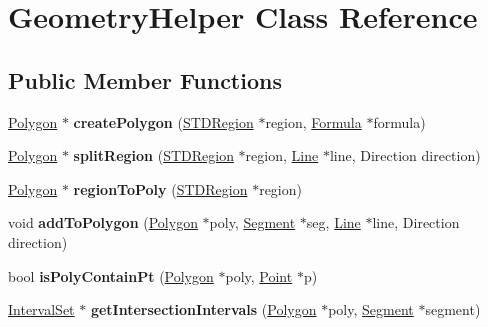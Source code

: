 \hypertarget{classGeometryHelper}{\section{Geometry\-Helper Class Reference}
\label{classGeometryHelper}
}
\subsection*{Public Member Functions}
\begin{DoxyCompactItemize}
\item 
\hypertarget{classGeometryHelper_a23b405d720cf3806b073a406d9ae105f}{\hyperlink{classPolygon}{Polygon} $\ast$ {\bfseries create\-Polygon} (\hyperlink{classSTDRegion}{S\-T\-D\-Region} $\ast$region, \hyperlink{classFormula}{Formula} $\ast$formula)}\label{classGeometryHelper_a23b405d720cf3806b073a406d9ae105f}

\item 
\hypertarget{classGeometryHelper_a916aee5efb1bead5b9b31ae96113a740}{\hyperlink{classPolygon}{Polygon} $\ast$ {\bfseries split\-Region} (\hyperlink{classSTDRegion}{S\-T\-D\-Region} $\ast$region, \hyperlink{classLine}{Line} $\ast$line, Direction direction)}\label{classGeometryHelper_a916aee5efb1bead5b9b31ae96113a740}

\item 
\hypertarget{classGeometryHelper_aa838f64e3e5ba0bd51e974f504b46ee2}{\hyperlink{classPolygon}{Polygon} $\ast$ {\bfseries region\-To\-Poly} (\hyperlink{classSTDRegion}{S\-T\-D\-Region} $\ast$region)}\label{classGeometryHelper_aa838f64e3e5ba0bd51e974f504b46ee2}

\item 
\hypertarget{classGeometryHelper_a0c3abc152f2440a387def0530ca08b5e}{void {\bfseries add\-To\-Polygon} (\hyperlink{classPolygon}{Polygon} $\ast$poly, \hyperlink{classSegment}{Segment} $\ast$seg, \hyperlink{classLine}{Line} $\ast$line, Direction direction)}\label{classGeometryHelper_a0c3abc152f2440a387def0530ca08b5e}

\item 
\hypertarget{classGeometryHelper_ac1d7fd8e11f5613246c997efe4ad8b58}{bool {\bfseries is\-Poly\-Contain\-Pt} (\hyperlink{classPolygon}{Polygon} $\ast$poly, \hyperlink{structPoint}{Point} $\ast$p)}\label{classGeometryHelper_ac1d7fd8e11f5613246c997efe4ad8b58}

\item 
\hypertarget{classGeometryHelper_af6c198ccd6296b4f1a6bb8a019999eaf}{\hyperlink{classIntervalSet}{Interval\-Set} $\ast$ {\bfseries get\-Intersection\-Intervals} (\hyperlink{classPolygon}{Polygon} $\ast$poly, \hyperlink{classSegment}{Segment} $\ast$segment)}\label{classGeometryHelper_af6c198ccd6296b4f1a6bb8a019999eaf}


\end{DoxyCompactItemize}
